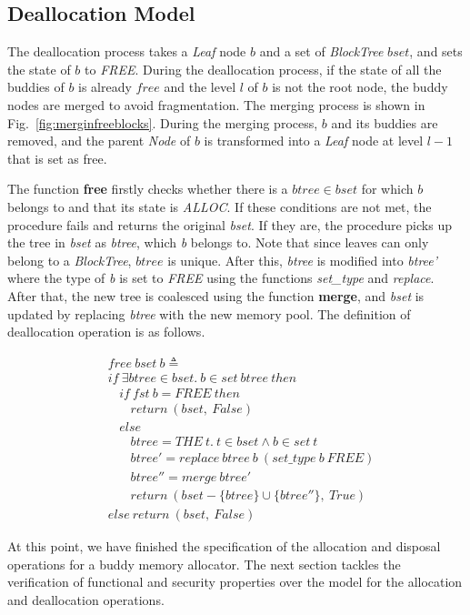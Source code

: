 \subsection{Deallocation Model}
The deallocation process takes a \emph{Leaf} node $b$ and a set of \emph{BlockTree} $bset$, and sets the state of $b$ to \emph{FREE}. During the deallocation process, if the state of all the buddies of $b$ is already $free$ and the level $l$ of $b$ is not the root node, the buddy nodes are merged to avoid fragmentation. The merging process is shown in Fig.~\ref{fig:merginfreeblocks}. During the merging process, $b$ and its buddies are removed, and the parent \emph{Node} of $b$ is transformed into a \emph{Leaf} node at level $l - 1$ that is set as free.

The function \textbf{free} firstly checks whether there is a $btree \in bset$ for which $b$ belongs to and that its state is \emph{ALLOC}. If these conditions are not met, the procedure fails and returns the original \emph{bset}. If they are, the procedure picks up the tree in \emph{bset} as \emph{btree}, which \emph{b} belongs to. Note that since leaves can only belong to a \emph{BlockTree}, $btree$ is unique. After this, \emph{btree} is modified into \emph{btree'} where the type of \emph{b} is set to \emph{FREE} using the functions \emph{set\_type} and \emph{replace}. After that, the new tree is coalesced using the function \textbf{merge}, and \emph{bset} is updated by replacing \emph{btree} with the new memory pool. The definition of deallocation operation is as follows.

\begin{definition} 
	\begin{align*}
	&free\ bset\ b \triangleq \\
	&if\ \exists btree \in bset.\ b \in set\ btree\ then \\
	&\ \ \ \ if\ fst\ b = FREE\ then \\
	&\ \ \ \ \ \ \ \ return\ (bset,\ False) \\
	&\ \ \ \ else \\
	&\ \ \ \ \ \ \ \ btree = THE\ t.\ t \in bset \wedge b \in set\ t \\
	&\ \ \ \ \ \ \ \ btree' = replace\ btree\ b\ (set\_type\ b\ FREE) \\
	&\ \ \ \ \ \ \ \ btree'' = merge\ btree' \\
	&\ \ \ \ \ \ \ \ return\ (bset - \lbrace btree \rbrace \cup \lbrace btree'' \rbrace,\ True) \\
	&else\ return\ (bset,\ False)
	\end{align*}
\end{definition}

At this point, we have finished the specification of the allocation and disposal operations for a buddy memory allocator. The next section tackles the verification of functional and security properties over the model for the allocation and deallocation operations.